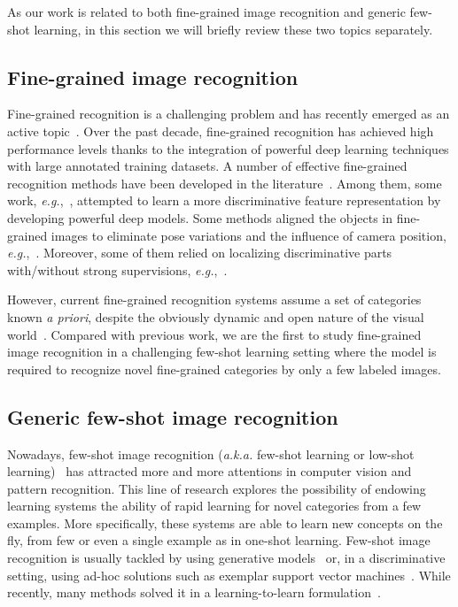 \documentclass[10pt,twocolumn,letterpaper]{article}
\begin{document}
As our work is related to both fine-grained image recognition and generic few-shot learning, in this section we will briefly review these two topics separately.

\subsection{Fine-grained image recognition}

Fine-grained recognition is a challenging problem and has recently emerged as an active topic~\cite{Khosla11stanforddogs, cars, WahCUB200_2011}. Over the past decade, fine-grained recognition has achieved high performance levels thanks to the integration of powerful deep learning techniques with large annotated training datasets. A number of effective fine-grained recognition methods have been developed in the literature~\cite{Steve14BMVC, Taomei17CVPR, Shao16CVPR, Max15NIPS, Di15CVPR, Tsungyu15ICCV, Yu16TIP}. Among them, some work, \emph{e.g.},~\cite{Max15NIPS, Tsungyu15ICCV}, attempted to learn a more discriminative feature representation by developing powerful deep models. Some methods aligned the objects in fine-grained images to eliminate pose variations and the influence of camera position, \emph{e.g.},~\cite{Steve14BMVC, Di15CVPR}. Moreover, some of them relied on localizing discriminative parts with/without strong supervisions, \emph{e.g.},~\cite{Taomei17CVPR, Shao16CVPR, Di15CVPR}.

However, current fine-grained recognition systems assume a set of categories known \emph{a priori}, despite the obviously dynamic and open nature of the visual world~\cite{feedforward16NIPS,Wang16ECCV,L2Lobjdec15CVPR}. Compared with previous work, we are the first to study fine-grained image recognition in a challenging few-shot learning setting where the model is required to recognize novel fine-grained categories by only a few labeled images.

\subsection{Generic few-shot image recognition}

Nowadays, few-shot image recognition (\emph{a.k.a.} few-shot learning or low-shot learning)~\cite{feedforward16NIPS, matchnet16NIPS} has attracted more and more attentions in computer vision and pattern recognition. This line of research explores the possibility of endowing learning systems the ability of rapid learning for novel categories from a few examples. More specifically, these systems are able to learn new concepts on the fly, from few or even a single example as in one-shot learning. Few-shot image recognition is usually tackled by using generative models~\cite{science,rezende16ICML} or, in a discriminative setting, using ad-hoc solutions such as exemplar support vector machines~\cite{exemplarSVM11ICCV}. While recently, many methods solved it in a learning-to-learn formulation~\cite{modelago17ICML, unsupervised16NIPS, L2Lobjdec15CVPR, Wang16ECCV, Serena17CVPR}.
\end{document}
